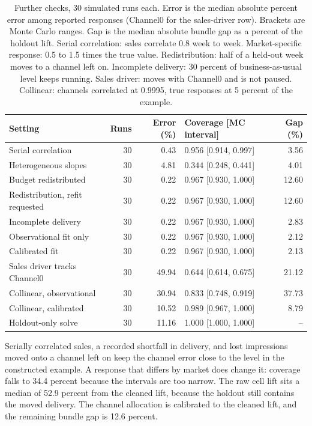 \documentclass[preprint,12pt]{elsarticle}
\begin{document}
\begin{table}[H]
\centering
\caption{Further checks, 30 simulated runs each. Error is the median absolute percent error among reported responses (Channel0 for the sales-driver row). Brackets are Monte Carlo ranges. Gap is the median absolute bundle gap as a percent of the holdout lift. Serial correlation: sales correlate 0.8 week to week. Market-specific response: 0.5 to 1.5 times the true value. Redistribution: half of a held-out week moves to a channel left on. Incomplete delivery: 30 percent of business-as-usual level keeps running. Sales driver: moves with Channel0 and is not paused. Collinear: channels correlated at 0.9995, true responses at 5 percent of the example.}
\label{tab:robustness}
\footnotesize
\setlength{\tabcolsep}{3pt}
\begin{tabular}{lrrlr}
\toprule
Setting & Runs & Error (\%) & Coverage [MC interval] & Gap (\%) \\
\midrule
Serial correlation & 30 & 0.43 & 0.956 [0.914, 0.997] & 3.56 \\
Heterogeneous slopes & 30 & 4.81 & 0.344 [0.248, 0.441] & 4.01 \\
Budget redistributed & 30 & 0.22 & 0.967 [0.930, 1.000] & 12.60 \\
Redistribution, refit requested & 30 & 0.22 & 0.967 [0.930, 1.000] & 12.60 \\
Incomplete delivery & 30 & 0.22 & 0.967 [0.930, 1.000] & 2.83 \\
Observational fit only & 30 & 0.22 & 0.967 [0.930, 1.000] & 2.12 \\
Calibrated fit & 30 & 0.22 & 0.967 [0.930, 1.000] & 2.13 \\
Sales driver tracks Channel0 & 30 & 49.94 & 0.644 [0.614, 0.675] & 21.12 \\
Collinear, observational & 30 & 30.94 & 0.833 [0.748, 0.919] & 37.73 \\
Collinear, calibrated & 30 & 10.52 & 0.989 [0.967, 1.000] & 8.79 \\
Holdout-only solve & 30 & 11.16 & 1.000 [1.000, 1.000] & -- \\
\bottomrule
\end{tabular}
\end{table}

Serially correlated sales, a recorded shortfall in delivery, and lost impressions moved onto a channel left on keep the channel error close to the level in the constructed example. A response that differs by market does change it: coverage falls to 34.4 percent because the intervals are too narrow. The raw cell lift sits a median of 52.9 percent from the cleaned lift, because the holdout still contains the moved delivery. The channel allocation is calibrated to the cleaned lift, and the remaining bundle gap is 12.6 percent.
\end{document}
